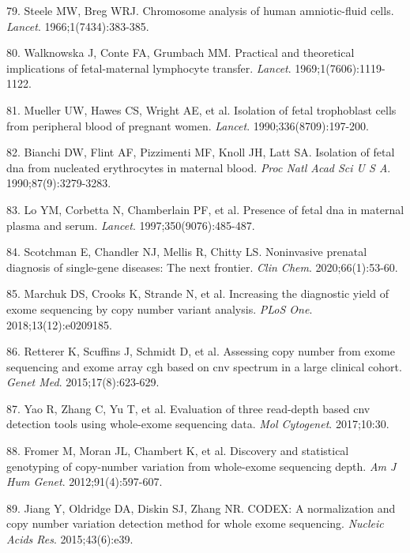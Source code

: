 \documentclass[11pt,letterpaper]{book}
\begin{document}
\leavevmode\hypertarget{ref-steele:1966aa}{}%
79. Steele MW, Breg WRJ. Chromosome analysis of human amniotic-fluid cells. \emph{Lancet}. 1966;1(7434):383-385.

\leavevmode\hypertarget{ref-walknowska:1969aa}{}%
80. Walknowska J, Conte FA, Grumbach MM. Practical and theoretical implications of fetal-maternal lymphocyte transfer. \emph{Lancet}. 1969;1(7606):1119-1122.

\leavevmode\hypertarget{ref-mueller:1990aa}{}%
81. Mueller UW, Hawes CS, Wright AE, et al. Isolation of fetal trophoblast cells from peripheral blood of pregnant women. \emph{Lancet}. 1990;336(8709):197-200.

\leavevmode\hypertarget{ref-bianchi:1990aa}{}%
82. Bianchi DW, Flint AF, Pizzimenti MF, Knoll JH, Latt SA. Isolation of fetal dna from nucleated erythrocytes in maternal blood. \emph{Proc Natl Acad Sci U S A}. 1990;87(9):3279-3283.

\leavevmode\hypertarget{ref-lo:1997aa}{}%
83. Lo YM, Corbetta N, Chamberlain PF, et al. Presence of fetal dna in maternal plasma and serum. \emph{Lancet}. 1997;350(9076):485-487.

\leavevmode\hypertarget{ref-scotchman:2020aa}{}%
84. Scotchman E, Chandler NJ, Mellis R, Chitty LS. Noninvasive prenatal diagnosis of single-gene diseases: The next frontier. \emph{Clin Chem}. 2020;66(1):53-60.

\leavevmode\hypertarget{ref-marchuk:2018aa}{}%
85. Marchuk DS, Crooks K, Strande N, et al. Increasing the diagnostic yield of exome sequencing by copy number variant analysis. \emph{PLoS One}. 2018;13(12):e0209185.

\leavevmode\hypertarget{ref-retterer:2015aa}{}%
86. Retterer K, Scuffins J, Schmidt D, et al. Assessing copy number from exome sequencing and exome array cgh based on cnv spectrum in a large clinical cohort. \emph{Genet Med}. 2015;17(8):623-629.

\leavevmode\hypertarget{ref-yao:2017aa}{}%
87. Yao R, Zhang C, Yu T, et al. Evaluation of three read-depth based cnv detection tools using whole-exome sequencing data. \emph{Mol Cytogenet}. 2017;10:30.

\leavevmode\hypertarget{ref-fromer:2012aa}{}%
88. Fromer M, Moran JL, Chambert K, et al. Discovery and statistical genotyping of copy-number variation from whole-exome sequencing depth. \emph{Am J Hum Genet}. 2012;91(4):597-607.

\leavevmode\hypertarget{ref-jiang:2015aa}{}%
89. Jiang Y, Oldridge DA, Diskin SJ, Zhang NR. CODEX: A normalization and copy number variation detection method for whole exome sequencing. \emph{Nucleic Acids Res}. 2015;43(6):e39.
\end{document}
